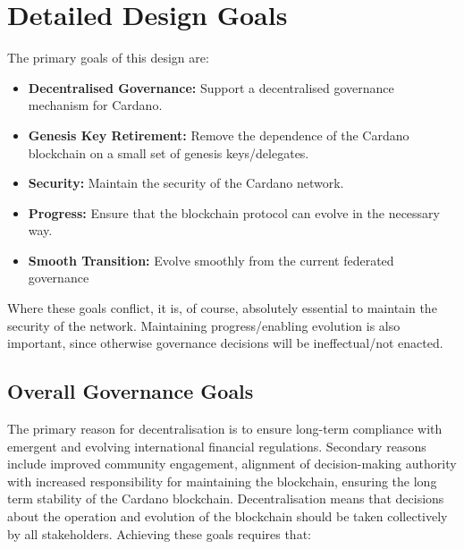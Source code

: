 \section{Detailed Design Goals}
\label{sect:goals}

The primary goals of this design are:

\begin{itemize}
\item
  \textbf{Decentralised Governance:}
  Support a decentralised governance mechanism for Cardano.
\item
  \textbf{Genesis Key Retirement:}
  Remove the dependence of the Cardano blockchain on a small set of genesis keys/delegates.
\item
  \textbf{Security:}
  Maintain the security of the Cardano network.
\item
  \textbf{Progress:}
  Ensure that the blockchain protocol can evolve in the necessary way.
\item
  \textbf{Smooth Transition:}
  Evolve smoothly from the current federated governance
\end{itemize}

Where these goals conflict, it is, of course, absolutely essential to maintain the security of the network.  Maintaining progress/enabling
evolution is also important, since otherwise governance decisions will be ineffectual/not enacted.

\subsection{Overall Governance Goals}

The primary reason for decentralisation is to ensure long-term compliance with emergent and evolving international financial regulations.
Secondary reasons include improved community engagement, alignment of decision-making authority with increased responsibility for maintaining the blockchain,
ensuring the long term stability of the Cardano blockchain.  Decentralisation means that decisions about the operation and evolution of the blockchain
should be taken collectively by all stakeholders.
%
Achieving these goals requires that:

